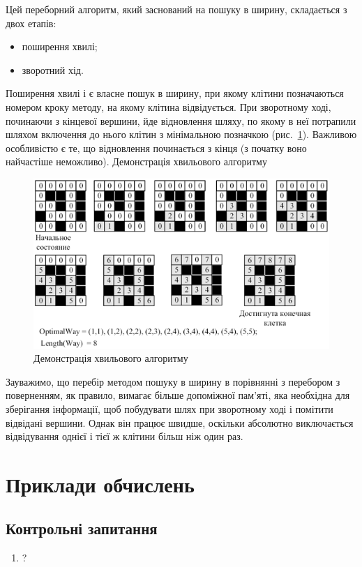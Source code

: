 Цей переборний алгоритм, який заснований на пошуку в ширину, складається з двох етапів:
\begin{itemize}
\item поширення хвилі;
\item зворотний хід.
\end{itemize}
 
Поширення хвилі і є власне пошук в ширину, при якому клітини позначаються номером кроку методу, на якому клітина відвідується. При зворотному ході, починаючи з кінцевої вершини, йде відновлення шляху, по якому в неї потрапили шляхом включення до нього клітин з мінімальною позначкою (рис.~\ref{pic:45.4}). Важливою особливістю є те, що відновлення починається з кінця (з початку воно найчастіше неможливо).
Демонстрація хвильового алгоритму

\begin{figure}
\caption{Демонстрація хвильового алгоритму}\label{pic:45.4}
\includegraphics[width=13cm]{pic/45_04.png}
\end{figure}


Зауважимо, що перебір методом пошуку в ширину в порівнянні з перебором з поверненням, як правило, вимагає більше допоміжної пам'яті, яка необхідна для зберігання інформації, щоб побудувати шлях при зворотному ході і помітити відвідані вершини. Однак він працює швидше, оскільки абсолютно виключається відвідування однієї і тієї ж клітини більш ніж один раз.

\section{Приклади обчислень}
\nopagebreak[4]




\subsection*{Контрольні запитання}
\nopagebreak[4]
\begin{enumerate}
\item ?
\end{enumerate}



